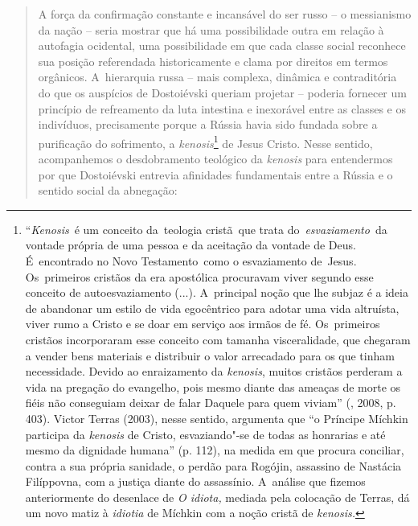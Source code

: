 {\begin{quote}
A força da confirmação constante e incansável do ser russo -- o
messianismo da nação -- seria mostrar que há uma possibilidade outra em
relação à autofagia ocidental, uma possibilidade em que cada classe
social reconhece sua posição referendada historicamente e clama por
direitos em termos orgânicos. A~hierarquia russa -- mais complexa,
dinâmica e contraditória do que os auspícios de Dostoiévski queriam
projetar -- poderia fornecer um princípio de refreamento da luta
intestina e inexorável entre as classes e os indivíduos, precisamente
porque a Rússia havia sido fundada sobre a purificação do sofrimento, a
\emph{kenosis}\footnote{``\emph{Kenosis}~é um conceito da~teologia
  cristã~que trata do~\emph{esvaziamento}~da vontade própria de uma
  pessoa e da aceitação da vontade de Deus. É~encontrado no Novo
  Testamento~como o esvaziamento de~Jesus. Os~primeiros cristãos da era
  apostólica procuravam viver segundo esse conceito de autoesvaziamento
  (...). A~principal noção que lhe subjaz é a ideia de abandonar um
  estilo de vida egocêntrico para adotar uma vida altruísta, viver rumo
  a Cristo e se doar em serviço aos irmãos de fé. Os~primeiros cristãos
  incorporaram esse conceito com tamanha visceralidade, que chegaram a
  vender bens materiais e distribuir o valor arrecadado para os que
  tinham necessidade. Devido ao enraizamento da \emph{kenosis}, muitos
  cristãos perderam a vida na pregação do evangelho, pois mesmo diante
  das ameaças de morte os fiéis não conseguiam deixar de falar Daquele
  para quem viviam'' (, 2008, p. 403). Victor Terras (2003),
  nesse sentido, argumenta que ``o Príncipe Míchkin participa da
  \emph{kenosis} de Cristo, esvaziando"-se de todas as honrarias e até
  mesmo da dignidade humana'' (p. 112), na medida em que procura
  conciliar, contra a sua própria sanidade, o perdão para Rogójin,
  assassino de Nastácia Filíppovna, com a justiça diante do assassínio.
  A~análise que fizemos anteriormente do desenlace de \emph{O idiota,}
  mediada pela colocação de Terras, dá um novo matiz à \emph{idiotia} de
  Míchkin com a noção cristã de \emph{kenosis. }} de Jesus Cristo. Nesse
sentido, acompanhemos o desdobramento teológico da \emph{kenosis} para
entendermos por que Dostoiévski entrevia afinidades fundamentais entre a
Rússia e o sentido social da abnegação:


\end{quote}}

